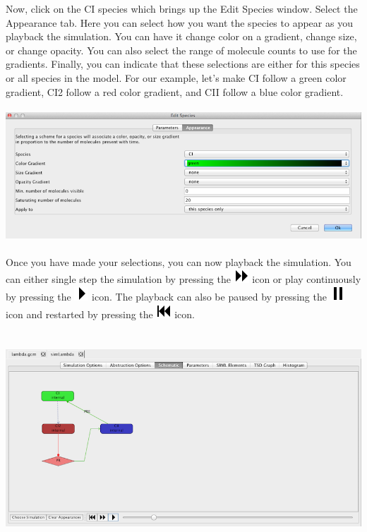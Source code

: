 \documentclass[titlepage,11pt]{article}
\begin{document}
Now, click on the CI species which brings up the Edit Species window.  Select the Appearance tab.  Here you can select how you want the species to appear as you playback the simulation.  You can have it change color on a gradient, change size, or change opacity.  You can also select the range of molecule counts to use for the gradients.  Finally, you can indicate that these selections are either for this species or all species in the model.  For our example, let's make CI follow a green color gradient, CI2 follow a red color gradient, and CII follow a blue color gradient.
\begin{center}
\includegraphics[height=50mm]{screenshots/editSpeciesAppearance}
\end{center}

Once you have made your selections, you can now playback the simulation.  You can either single step the simulation by pressing the \includegraphics{../gui/icons/modelview/movie/single_step} icon or play continuously by pressing the \includegraphics{../gui/icons/modelview/movie/play} icon.  The playback can also be paused by pressing the \includegraphics{../gui/icons/modelview/movie/pause} icon and restarted by pressing the  \includegraphics{../gui/icons/modelview/movie/rewind} icon. 

\begin{center}
\includegraphics[height=80mm]{screenshots/movieView}
\end{center}
\end{document}

